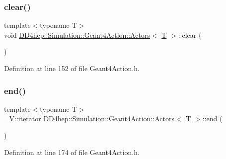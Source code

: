 \subsubsection{\texorpdfstring{clear()}{clear()}}
{\footnotesize\ttfamily template$<$typename T$>$ \\
void \hyperlink{class_d_d4hep_1_1_simulation_1_1_geant4_action_1_1_actors}{D\+D4hep\+::\+Simulation\+::\+Geant4\+Action\+::\+Actors}$<$ \hyperlink{class_t}{T} $>$\+::clear (\begin{DoxyParamCaption}{ }\end{DoxyParamCaption})\hspace{0.3cm}{\ttfamily [inline]}}



Definition at line 152 of file Geant4\+Action.\+h.

\hypertarget{class_d_d4hep_1_1_simulation_1_1_geant4_action_1_1_actors_aa1b133c19db8c70d6a46a19fefa430a2}{}\label{class_d_d4hep_1_1_simulation_1_1_geant4_action_1_1_actors_aa1b133c19db8c70d6a46a19fefa430a2} 
\subsubsection{\texorpdfstring{end()}{end()}\hspace{0.1cm}{\footnotesize\ttfamily [1/2]}}
{\footnotesize\ttfamily template$<$typename T$>$ \\
\+\_\+\+V\+::iterator \hyperlink{class_d_d4hep_1_1_simulation_1_1_geant4_action_1_1_actors}{D\+D4hep\+::\+Simulation\+::\+Geant4\+Action\+::\+Actors}$<$ \hyperlink{class_t}{T} $>$\+::end (\begin{DoxyParamCaption}{ }\end{DoxyParamCaption})\hspace{0.3cm}{\ttfamily [inline]}}



Definition at line 174 of file Geant4\+Action.\+h.

\hypertarget{class_d_d4hep_1_1_simulation_1_1_geant4_action_1_1_actors_ad19506200e952a7953b94c1d2149f49f}{}\label{class_d_d4hep_1_1_simulation_1_1_geant4_action_1_1_actors_ad19506200e952a7953b94c1d2149f49f} 
